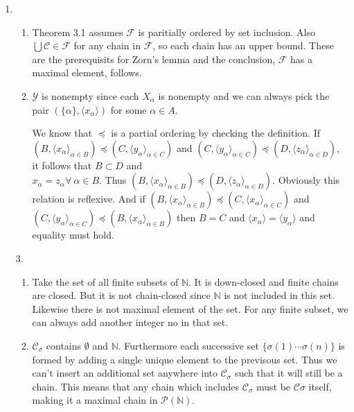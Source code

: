 \documentclass[11pt,letter]{article}
\begin{document}
\begin{enumerate}
    \item \begin{enumerate}
        \item Theorem 3.1 assumes $\mathcal{F}$ is paritially ordered by set inclusion. Also $\bigcup \mathcal{C} \in \mathcal{F}$ for any chain in $\mathcal{F}$, so each chain has an upper bound. These are the prerequisits for Zorn's lemma and the conclusion, $\mathcal{F}$ has a maximal element, follows.
        
        \item $\mathcal{Y}$ is nonempty since each $X_\alpha$ is nonempty and we can always pick the pair $(\{\alpha\}, \langle x_\alpha \rangle)$ for some $\alpha \in A$.
        
        We know that $\preceq$ is a partial ordering by checking the definition. If $(B, \langle x_\alpha \rangle_{\alpha \in B}) \preceq (C, \langle y_\alpha \rangle_{\alpha \in C})$ and $(C, \langle y_\alpha \rangle_{\alpha \in C}) \preceq (D, \langle z_\alpha \rangle_{\alpha \in D})$, it follows that $B \subset D$ and \\$x_\alpha = z_\alpha \forall \ \alpha \in B$. Thus $(B, \langle x_\alpha \rangle_{\alpha \in B}) \preceq (D, \langle z_\alpha \rangle_{\alpha \in D})$. Obviously this relation is reflexive. And if $(B, \langle x_\alpha \rangle_{\alpha \in B}) \preceq (C, \langle x_\alpha \rangle_{\alpha \in C})$ and $(C, \langle y_\alpha \rangle_{\alpha \in C}) \preceq (B, \langle x_\alpha \rangle_{\alpha \in B})$ then $B = C$ and $\langle x_\alpha \rangle = \langle y_\alpha \rangle$ and equality must hold.
    \end{enumerate}

    
    \item[3.] \begin{enumerate}
        \item Take the set of all finite subsets of $\mathbb{N}$. It is down-closed and finite chains are closed. But it is not chain-closed since $\mathbb{N}$ is not included in this set. Likewise there is not maximal element of the set. For any finite subset, we can always add another integer no in that set.
        
        \item $\mathcal{C}_\sigma$ contains $\emptyset$ and $\mathbb{N}$. Furthermore each successive set $\{\sigma(1) \cdots \sigma(n)\}$ is formed by adding a single unique element to the previsous set. Thus we can't insert an additional set anywhere into $\mathcal{C}_\sigma$ such that it will still be a chain. This means that any chain which includes $\mathcal{C}_\sigma$ must be $\mathcal{C}\sigma$ itself, making it a maximal chain in $\mathcal{P}(\mathbb{N})$.
        

\end{enumerate}
\end{enumerate}
\end{document}
